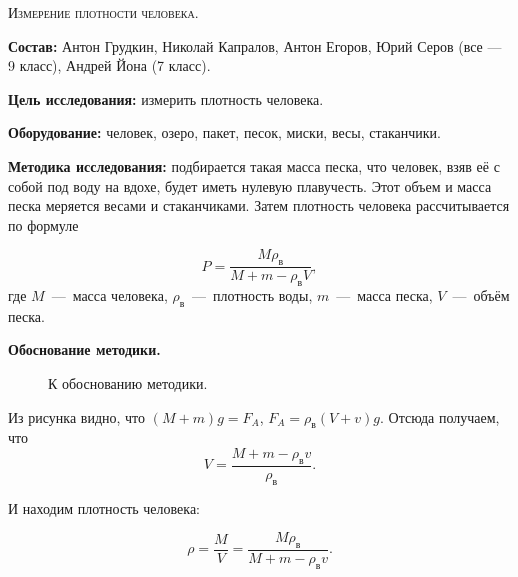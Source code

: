 \begin{center}
  \large{\textsc{Измерение плотности человека. }}
\end{center}

\textbf{Состав:} Антон Грудкин, Николай Капралов, Антон
Егоров, Юрий Серов (все --- 9 класс), Андрей Йона (7 класс).

\textbf{Цель исследования:} измерить плотность человека. 

\textbf{Оборудование:} человек, озеро, пакет, песок, миски, весы, стаканчики.

\textbf{Методика исследования:} подбирается такая масса песка, что
человек, взяв её с собой под воду на вдохе, будет иметь нулевую
плавучесть. Этот объем и масса песка меряется весами и
стаканчиками. Затем плотность человека рассчитывается по формуле

\begin{equation}
  \label{eq:bz09_01}
  P = \frac{M \rho_{\text{в}}}{M + m - \rho_{\text{в}} V},
\end{equation}
где $M$~---~масса человека, $\rho_{\text{в}}$~---~плотность воды,
$m$~---~масса песка, $V$~---~объём песка. 

\begin{center}
  \textbf{Обоснование методики.}  
\end{center}

\begin{figure}[ht]
  \centering
  \caption{К обоснованию методики.}
  \label{fig:bz09_density}
\end{figure}

Из рисунка видно, что $(M+m)g=F_A$, $F_A = \rho_{\text{в}} (V+v)
g$. Отсюда получаем, что
\begin{equation}
  \label{eq:bz09_1}
  V= \frac{M+m-\rho_{\text{в}} v} {\rho_{\text{в}}}.
\end{equation}

И находим плотность человека: 

\begin{equation}
  \label{eq:bz09_2}
  \rho = \frac{M}{V} = \frac{M \rho_{\text{в}}} {M+m-\rho_{\text{в}} v}.
\end{equation}

